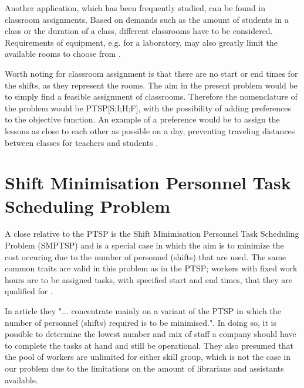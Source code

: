 Another application, which has been frequently studied, can be found in classroom assignments. Based on demands such as the amount of students in a class or the duration of a class, different classrooms have to be considered. Requirements of equipment, e.g. for a laboratory, may also greatly limit the available rooms to choose from \cite{krishnamoorthy_2001}.

Worth noting for classroom assignment is that there are no start or end times for the shifts, as they represent the rooms. The aim in the present problem would be to simply find a feasible assignment of classrooms. Therefore the nomenclature of the problem would be PTSP[S;I;H;F], with the possibility of adding preferences to the objective function. An example of a preference would be to assign the lessons as close to each other as possible on a day, preventing traveling distances between classes for teachers and students \cite{krishnamoorthy_2001}.



%
%



\section{Shift Minimisation Personnel Task Scheduling Problem}\label{SMTSP}

A close relative to the PTSP is the Shift Minimisation Personnel Task Scheduling Problem (SMPTSP) and is a special case in which the aim is to minimize the cost occuring due to the number of personnel (shifts) that are used. The same common traits are valid in this problem as in the PTSP; workers with fixed work hours are to be assigned tasks, with specified start and end times, that they are qualified for \cite{krishnamoorthy_2011}.

In article \cite{krishnamoorthy_2011} they "... concentrate mainly on a variant of the PTSP in which the number of personnel (shifts) required is to be minimised.". In doing so, it is possible to determine the lowest number and mix of staff a company should have to complete the tasks at hand and still be operational. They also presumed that the pool of workers are unlimited for either skill group, which is not the case in our problem due to the limitations on the amount of librarians and assistants available. 

